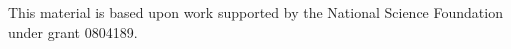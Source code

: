 \noindent

\bigskip\noindent
This material is based upon work supported by the National Science
Foundation under
grant 0804189.



\smallskip
\newpage

